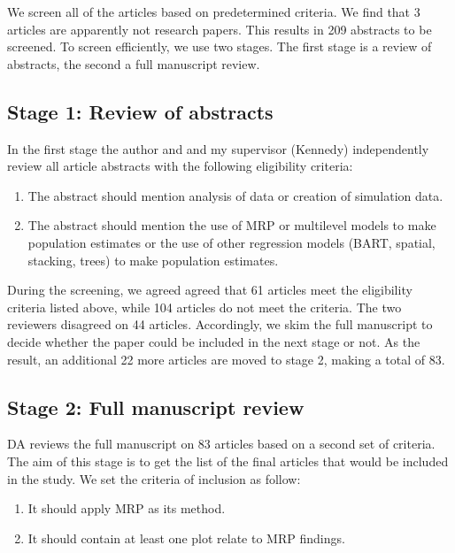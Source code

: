 \documentclass{monashthesis}
\begin{document}
We screen all of the articles based on predetermined criteria. We find that 3 articles are apparently not research papers. This results in 209 abstracts to be screened. To screen efficiently, we use two stages. The first stage is a review of abstracts, the second a full manuscript review.

\hypertarget{stage-1-review-of-abstracts}{%
\subsection{Stage 1: Review of abstracts}\label{stage-1-review-of-abstracts}}

In the first stage the author and and my supervisor (Kennedy) independently review all article abstracts with the following eligibility criteria:

\begin{enumerate}
\def\labelenumi{\arabic{enumi}.}
\tightlist
\item
  The abstract should mention analysis of data or creation of simulation data.
\item
  The abstract should mention the use of MRP or multilevel models to make population estimates or the use of other regression models (BART, spatial, stacking, trees) to make population estimates.
\end{enumerate}

During the screening, we agreed agreed that 61 articles meet the eligibility criteria listed above, while 104 articles do not meet the criteria. The two reviewers disagreed on 44 articles. Accordingly, we skim the full manuscript to decide whether the paper could be included in the next stage or not. As the result, an additional 22 more articles are moved to stage 2, making a total of 83.

\hypertarget{stage-2-full-manuscript-review}{%
\subsection{Stage 2: Full manuscript review}\label{stage-2-full-manuscript-review}}

DA reviews the full manuscript on 83 articles based on a second set of criteria. The aim of this stage is to get the list of the final articles that would be included in the study. We set the criteria of inclusion as follow:

\begin{enumerate}
\def\labelenumi{\arabic{enumi}.}
\tightlist
\item
  It should apply MRP as its method.
\item
  It should contain at least one plot relate to MRP findings.
\end{enumerate}
\end{document}
